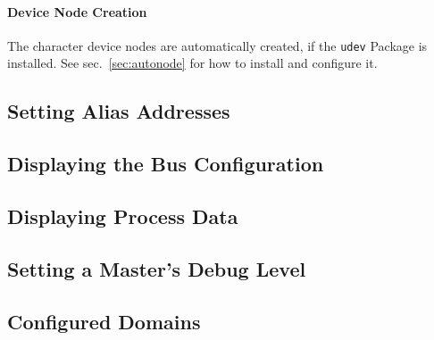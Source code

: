 \documentclass[a4paper,12pt,BCOR6mm,bibtotoc,idxtotoc]{scrbook}
\begin{document}
\paragraph{Device Node Creation} The character device nodes are automatically
created, if the \lstinline+udev+ Package is installed. See
sec.~\ref{sec:autonode} for how to install and configure it.


\subsection{Setting Alias Addresses}
\label{sec:ethercat-alias}




\subsection{Displaying the Bus Configuration}
\label{sec:ethercat-config}




\subsection{Displaying Process Data}




\subsection{Setting a Master's Debug Level}




\subsection{Configured Domains}
\end{document}
